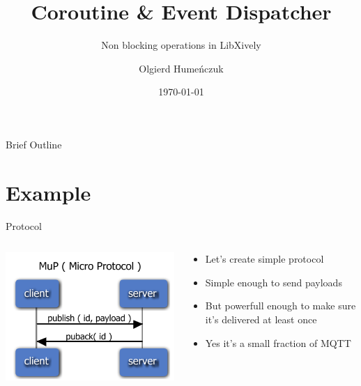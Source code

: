 \documentclass{beamer}
\title{Coroutine \& Event Dispatcher}
\subtitle{Non blocking operations in LibXively}
\author{Olgierd Humeńczuk}
\date{\today}
\begin{document}
\begin{frame}
	\titlepage
\end{frame}

\begin{frame}{Brief Outline}
	\tableofcontents
\end{frame}

\section{Example}

\begin{frame}{Protocol}

\begin{columns}
   \begin{column}{0.5\textwidth}
      \centerline{\includegraphics[width=1.0\textwidth]{slides/MuP.pdf}}
   \end{column}
   \begin{column}{0.5\textwidth}
      \begin{itemize}[<+->]
         \item Let's create simple protocol
         \item Simple enough to send payloads
         \item But powerfull enough to make sure it's delivered at least once
         \item Yes it's a small fraction of MQTT
      \end{itemize}
    \end{column}
\end{columns}

\end{frame}
\end{document}
